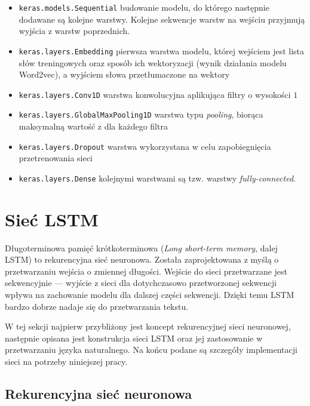 \begin{itemize}
	\item \verb_keras.models.Sequential_ budowanie modelu, do którego następnie dodawane są kolejne warstwy. Kolejne sekwencje warstw na wejściu przyjmują wyjścia z warstw poprzednich.
	
	\item \verb_keras.layers.Embedding_ pierwsza warstwa modelu, której wejściem jest lista słów treningowych oraz sposób ich wektoryzacji (wynik działania modelu Word2vec), a wyjściem słowa przetłumaczone na wektory
	
	\item \verb_keras.layers.Conv1D_ warstwa konwolucyjna  aplikująca filtry o wysokości $1$
	
	\item \verb_keras.layers.GlobalMaxPooling1D_ warstwa typu \textit{pooling}, biorąca maksymalną wartość z dla każdego filtra 
	
	\item \verb_keras.layers.Dropout_ warstwa wykorzystana w celu zapobiegnięcia przetrenowania sieci
	
	\item \verb_keras.layers.Dense_ kolejnymi warstwami są tzw. warstwy \textit{fully-connected}. 
	
\end{itemize}


\section{Sieć LSTM}
\label{sec:lstm}

Długoterminowa pamięć krótkoterminowa (\textit{Long short-term memory}, dalej LSTM) to rekurencyjna sieć neuronowa. Została zaprojektowana z myślą o przetwarzaniu wejścia o zmiennej długości. Wejście do sieci przetwarzane jest sekwencyjnie --- wyjście z sieci dla dotychczasowo przetworzonej sekwencji wpływa na zachowanie modelu dla dalszej części sekwencji. Dzięki temu LSTM bardzo dobrze nadaje się do przetwarzania tekstu.

W tej sekcji najpierw przybliżony jest koncept rekurencyjnej sieci neuronowej, następnie opisana jest konstrukcja sieci LSTM oraz jej zastosowanie w przetwarzaniu języka naturalnego. Na końcu podane są szczegóły implementacji sieci na potrzeby niniejszej pracy.

\subsection{Rekurencyjna sieć neuronowa}
\label{subsec:rnn}

